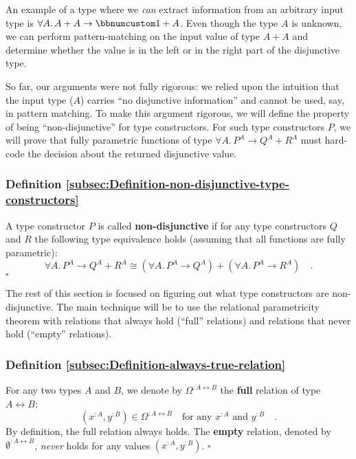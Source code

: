 An example of a type where we \emph{can} extract information from
an arbitrary input type is $\forall A.\,A+A\rightarrow\bbnum 1+A$.
Even though the type $A$ is unknown, we can perform pattern-matching
on the input value of type $A+A$ and determine whether the value
is in the left or in the right part of the disjunctive type.

So far, our arguments were not fully rigorous: we relied upon the
intuition that the input type ($A$) carries \textsf{``}no disjunctive information\textsf{''}
and cannot be used, say, in pattern matching. To make this argument
rigorous, we will define the property of being \textsf{``}non-disjunctive\textsf{''}
for type constructors. For such type constructors $P$, we will prove
that fully parametric functions of type $\forall A.\,P^{A}\rightarrow Q^{A}+R^{A}$
must hard-code the decision about the returned disjunctive value. 

\subsubsection{Definition \label{subsec:Definition-non-disjunctive-type-constructors}\ref{subsec:Definition-non-disjunctive-type-constructors}}

A type constructor $P$ is called \textbf{non-disjunctive}
if for any type constructors $Q$ and $R$ the following type equivalence
holds (assuming that all functions are fully parametric):
\begin{equation}
\forall A.\,P^{A}\rightarrow Q^{A}+R^{A}\cong(\forall A.\,P^{A}\rightarrow Q^{A})+(\forall A.\,P^{A}\rightarrow R^{A})\quad.\label{eq:non-disjunctive-type-equivalence}
\end{equation}
$\square$

The rest of this section is focused on figuring out what type constructors
are non-disjunctive. The main technique will be to use the relational
parametricity theorem with relations that always hold (\textsf{``}full\textsf{''}
relations) and relations that never hold (\textsf{``}empty\textsf{''} relations).

\subsubsection{Definition \label{subsec:Definition-always-true-relation}\ref{subsec:Definition-always-true-relation}}

For any two types $A$ and $B$, we denote by $\Omega^{:A\leftrightarrow B}$
the \textbf{full} relation of type $A\leftrightarrow B$:
\[
(x^{:A},y^{:B})\in\Omega^{:A\leftrightarrow B}\quad\text{for any }x^{:A}\text{ and }y^{:B}\quad.
\]
By definition, the full relation always holds. The \textbf{empty}
relation, denoted by $\emptyset^{:A\leftrightarrow B}$,
\emph{never} holds for any values $(x^{:A},y^{:B})$. $\square$


